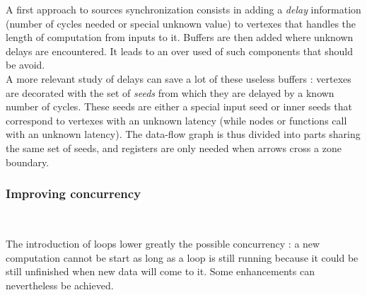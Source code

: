 \documentclass[10pt,a4paper]{article}
\renewcommand{\indent}{~\\\vspace{-.8cm}}
\begin{document}
A first approach to sources synchronization consists in adding a \textit{delay} information (number of cycles needed or special unknown value) to vertexes that handles the length of computation from inputs to it. Buffers are then added where unknown delays are encountered. It leads to an over used of such components that should be avoid. \\


A more relevant study of delays can save a lot of these useless buffers : vertexes are decorated with the set of \textit{seeds} from which they are delayed by a known number of cycles. These seeds are either a special input seed or inner seeds that correspond to vertexes with an unknown latency (while nodes or functions call with an unknown latency). The data-flow graph is thus divided into parts sharing the same set of seeds, and registers are only needed when arrows cross a zone boundary.



\subsubsection{Improving concurrency} \indent

The introduction of loops lower greatly the possible concurrency : a new computation cannot be start as long as a loop is still running because it could be still unfinished when new data will come to it. Some enhancements can nevertheless be achieved.






\end{document}
